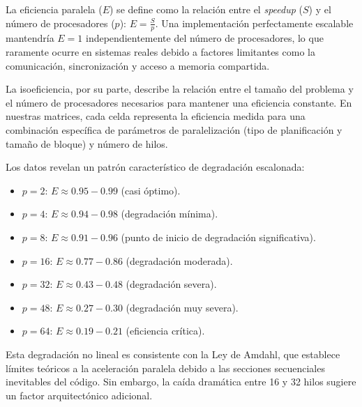         La eficiencia paralela ($E$) se define como la relación entre el \textit{speedup} ($S$) y el número de procesadores ($p$): $E = \frac{S}{p}$. Una implementación perfectamente escalable mantendría $E = 1$ independientemente del número de procesadores, lo que raramente ocurre en sistemas reales debido a factores limitantes como la comunicación, sincronización y acceso a memoria compartida.
        
        La isoeficiencia, por su parte, describe la relación entre el tamaño del problema y el número de procesadores necesarios para mantener una eficiencia constante. En nuestras matrices, cada celda representa la eficiencia medida para una combinación específica de parámetros de paralelización (tipo de planificación y tamaño de bloque) y número de hilos.
        
        Los datos revelan un patrón característico de degradación escalonada:
        
        \begin{itemize}
        
            \item $p = 2$: $E \approx 0.95-0.99$ (casi óptimo).
            
            \item $p = 4$: $E \approx 0.94-0.98$ (degradación mínima).
            
            \item $p = 8$: $E \approx 0.91-0.96$ (punto de inicio de degradación significativa).
            
            \item $p = 16$: $E \approx 0.77-0.86$ (degradación moderada).
            
            \item $p = 32$: $E \approx 0.43-0.48$ (degradación severa).
            
            \item $p = 48$: $E \approx 0.27-0.30$ (degradación muy severa).
            
            \item $p = 64$: $E \approx 0.19-0.21$ (eficiencia crítica).
            
        \end{itemize}

        Esta degradación no lineal es consistente con la Ley de Amdahl, que establece límites teóricos a la aceleración paralela debido a las secciones secuenciales inevitables del código. Sin embargo, la caída dramática entre 16 y 32 hilos sugiere un factor arquitectónico adicional.
        
